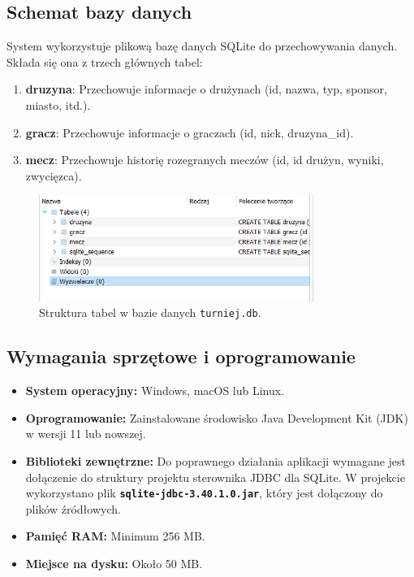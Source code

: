 \documentclass[12pt, a4paper]{article}
\begin{document}
\subsection{Schemat bazy danych}
System wykorzystuje plikową bazę danych SQLite do przechowywania danych. Składa się ona z trzech głównych tabel:
\begin{enumerate}
  \item \textbf{druzyna}: Przechowuje informacje o drużynach (id, nazwa, typ, sponsor, miasto, itd.).
  \item \textbf{gracz}: Przechowuje informacje o graczach (id, nick, druzyna\_id).
  \item \textbf{mecz}: Przechowuje historię rozegranych meczów (id, id drużyn, wyniki, zwycięzca).
\end{enumerate}

\begin{figure}[H]
 \centering
 \includegraphics[width=0.8\textwidth]{rysunek5.png}
 \caption{Struktura tabel w bazie danych \texttt{turniej.db}.}
 \label{fig:schemat_bazy}
\end{figure}

\subsection{Wymagania sprzętowe i oprogramowanie}
\begin{itemize}
    \item \textbf{System operacyjny:} Windows, macOS lub Linux.
    \item \textbf{Oprogramowanie:} Zainstalowane środowisko Java Development Kit (JDK) w wersji 11 lub nowszej.
    \item \textbf{Biblioteki zewnętrzne:} Do poprawnego działania aplikacji wymagane jest dołączenie do struktury projektu sterownika JDBC dla SQLite. W projekcie wykorzystano plik \textbf{\texttt{sqlite-jdbc-3.40.1.0.jar}}, który jest dołączony do plików źródłowych.
    \item \textbf{Pamięć RAM:} Minimum 256 MB.
    \item \textbf{Miejsce na dysku:} Około 50 MB.
\end{itemize}
\end{document}
